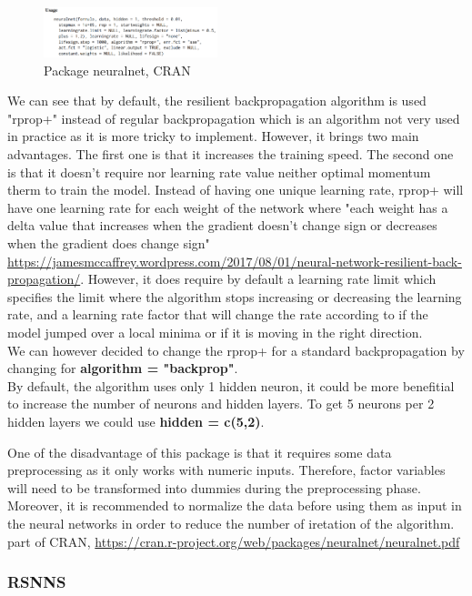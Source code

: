 \documentclass[6pt,letter]{article}\usepackage[]{graphicx}\usepackage[]{color}
\begin{document}
\begin{figure}[h]
    \centering
    \includegraphics[width=0.45\textwidth]{neuralnet_package.png}
     \caption{Package neuralnet, CRAN}
\end{figure}

We can see that by default, the resilient backpropagation algorithm is used "rprop+" instead of regular backpropagation which is an algorithm not very used in practice as it is more tricky to implement. However, it brings two main advantages. The first one is that it increases the training speed. The second one is that it doesn't require nor learning rate value neither optimal momentum therm to train the model. Instead of having one unique learning rate, rprop+ will have one learning rate for each weight of the network where "each weight has a delta value that increases when the gradient doesn't change sign or decreases when the gradient does change sign" \url{https://jamesmccaffrey.wordpress.com/2017/08/01/neural-network-resilient-back-propagation/}. However, it does require by default a learning rate limit which specifies the limit where the algorithm stops increasing or decreasing the learning rate, and a learning rate factor that will change the rate according to if the model jumped over a local minima or if it is moving in the right direction.\\
We can however decided to change the rprop+ for a standard backpropagation by changing for \textbf{algorithm = "backprop"}.\\

By default, the algorithm uses only 1 hidden neuron, it could be more benefitial to increase the number of neurons and hidden layers. To get 5 neurons per 2 hidden layers we could use \textbf{hidden = c(5,2)}.


One of the disadvantage of this package is that it requires some data preprocessing as it only works with numeric inputs. Therefore, factor variables will need to be transformed into dummies during the preprocessing phase. Moreover, it is recommended to normalize the data before using them as input in the neural networks in order to reduce the number of iretation of the algorithm.
part of CRAN, \url{https://cran.r-project.org/web/packages/neuralnet/neuralnet.pdf}
\subsubsection{RSNNS}
\end{document}
